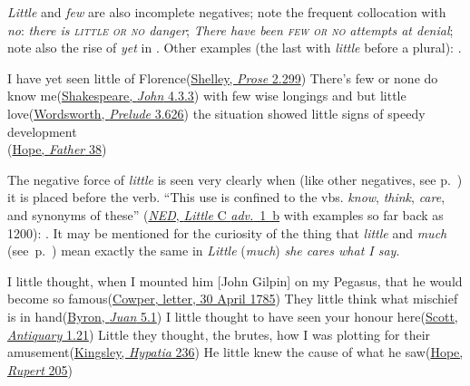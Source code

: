 \textit{Little} and \textit{few} are also incomplete negatives; note the frequent collocation with \textit{no}: \textit{there is \textsc{little or no} danger}; \textit{There have been \textsc{few or no} attempts at denial}; note also the rise of \textit{yet} in . Other examples (the last with \textit{little} before a plural): .

\ea \label{ex:04-275}
I have yet seen little of Florence\hfill(\href{https://archive.org/details/worksinversepros08sheluoft/page/130/mode/2up?view=theater&q=\%22little+of+florence%22}{Shelley, \textit{Prose} 2.299})
\ex \label{ex:04-276}
\ea There's few or none do know me\hfill(\href{https://internetshakespeare.uvic.ca/doc/Jn_F1/scene/4.3/index.html#tln-1995}{Shakespeare, \textit{John} 4.3.3})
\ex with few wise longings and but little love\hfill(\href{https://en.wikisource.org/wiki/The_Prelude_(Wordsworth)/Book_III}{Wordsworth, \textit{Prelude} 3.626})
\ex the situation showed little signs of speedy development\\\hfill(\href{https://archive.org/details/fatherstafford00hope/page/66/mode/2up?q=\%22signs+of+speedy+development\%22&view=theater}{Hope, \textit{Father} 38})
\z
\z

\label{para:little-a-little}The negative force of \textit{little} is seen very clearly when (like other negatives, see p.~\pageref{para:naturaltendency}) it is placed before the verb. ``This use is confined to the vbs. \textit{know}, \textit{think}, \textit{care}, and synonyms of these'' (\href{https://archive.org/details/oed6aarch/page/n365/mode/2up?view=theater}{\textit{NED}, \textit{Little} C \textit{adv.}~1~b} with examples so far back as 1200): . It may be mentioned for the curiosity of the thing that \textit{little} and \textit{much} (see~p.~\pageref{sec:ironic-much}) mean exactly the same in \textit{Little} (\textit{much}) \textit{she cares what I say}.

\ea \label{ex:04-279}
\ea
I little thought, when I mounted him [John Gilpin] on my Pegasus, that he would become so famous\hfill(\href{https://www.gutenberg.org/cache/epub/47790/pg47790-images.html#Page_198}{Cowper, letter, 30 April 1785})
\ex
They little think what mischief is in hand\hfill(\href{https://archive.org/details/workslordbyron10unkngoog/page/218/mode/2up?view=theater&q=\%22little+think+what%22}{Byron, \textit{Juan} 5.1})
\ex
I little thought to have seen your honour here\hfill(\href{https://archive.org/details/antiquary20unkngoog/page/n34/mode/2up?q=\%22little+thought\%22&view=theater}{Scott, \textit{Antiquary} 1.21})
\ex
Little they thought, the brutes, how I was plotting for their amusement\hfill(\href{https://archive.org/details/hypatia00kinggoog/page/n298/mode/2up?q=\%22little+they+thought\%22&view=theater}{Kingsley, \textit{Hypatia} 236}) %
\ex
He little knew the cause of what he saw\hfill(\href{https://archive.org/details/in.ernet.dli.2015.53170/page/n265/mode/2up?q=\%22little+knew+the+cause\%22&view=theater}{Hope, \textit{Rupert} 205})
\z
\z

